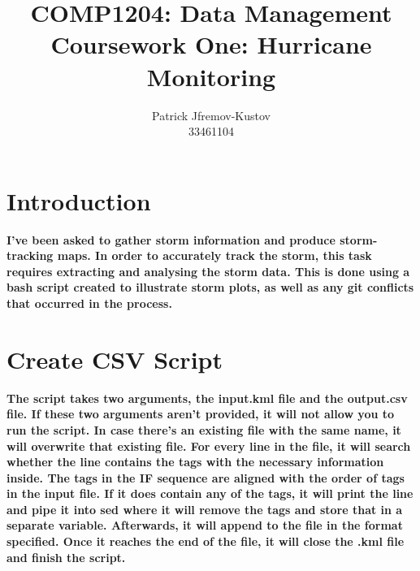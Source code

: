 \documentclass[]{article}
\title{COMP1204: Data Management \\ Coursework One: Hurricane Monitoring }
\author{Patrick Jfremov-Kustov \\ 33461104}
\begin{document}
\maketitle

\section{Introduction}

\textbf{I've been asked to gather storm information and produce storm-tracking maps. In order to accurately track the storm, this task requires extracting  and analysing the storm data. This is done using  a bash script created to illustrate storm plots, as well as any git conflicts that occurred in the process.}


\section{Create CSV Script}

\textbf{The script takes two arguments, the input.kml file and the output.csv file. If these two arguments aren't provided, it will not allow you to run the script. In case there's an existing file with the same name, it will overwrite that existing file. For every line in the file, it will search whether the line contains the tags with the necessary information inside. The tags in the IF sequence are aligned with the order of tags in the input file. If it does contain any of the tags, it will print the line and pipe it into sed where it will remove the tags and store that in a separate variable. Afterwards, it will append to the file in the format specified. Once it reaches the end of the file, it will close the .kml file and finish the script.}
\end{document}
